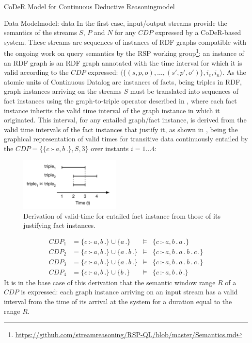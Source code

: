 \begin{nestedsection}{CoDeR Model for Continuous Deductive Reasoning}{model}
\begin{nestedsection}{Data Model}{model: data}
		In the first case, input/output streams provide the semantics of the streams $S$, $P$ and $N$ for any ${CDP}$ expressed by a CoDeR-based system.
		These streams are sequences of instances of RDF graphs compatible with the ongoing work on query semantics by the RSP working group\footnote{\url{https://github.com/streamreasoning/RSP-QL/blob/master/Semantics.md}};
		an instance of an RDF graph is an RDF graph annotated with the time interval for which it is valid \citep{SemanticStreamingManagement,sparkwave} according to the ${CDP}$ expressed: ${\langle \{(s,p,o),\dots,(s',p',o')\},i_{e},i_{n} \rangle}$.
		As the atomic units of Continuous Datalog are instances of facts, being triples in RDF, graph instances arriving on the streams $S$ must be translated into sequences of fact instances using the graph-to-triple operator described in , where each fact instance inherits the valid time interval of the graph instance in which it originated.
		This interval, for any entailed graph/fact instance, is derived from the valid time intervals of the fact instances that justify it, as shown in , being the graphical representation of valid times for transitive data continuously entailed by the ${CDP = \{\{c\,\text{:-}\,a,b\,.\},S,3\}}$ over instants ${i = 1 \dots 4}$:
		\begin{figure}[t]
			\centering
			\includegraphics[width=0.45\textwidth]{intersected-intervals}
			\caption{Derivation of valid-time for entailed fact instance from those of its justifying fact instances.}
		\end{figure}
		\begin{align*}
			CDP_{1} & = \{c\,\text{:-}\,a,b\,.\} \cup \{ a \, . \} & \vDash & \{ c\,\text{:-}\,a,b\,. \, a \, . \} \\
			CDP_{2} & = \{c\,\text{:-}\,a,b\,.\} \cup \{ a \, . \, b \, . \} & \vDash & \{ c\,\text{:-}\,a,b\,. \, a \, . \, b \, . \, c \, . \} \\
			CDP_{3} & = \{c\,\text{:-}\,a,b\,.\} \cup \{ a \, . \, b \, . \} & \vDash & \{ c\,\text{:-}\,a,b\,. \, a \, . \, b \, . \, c \, . \} \\
			CDP_{4} & = \{c\,\text{:-}\,a,b\,.\} \cup \{ b \, . \} & \vDash & \{ c\,\text{:-}\,a,b\,. \, b \, . \}
		\end{align*}
		It is in the base case of this derivation that the semantic window range $R$ of a ${CDP}$ is expressed:
		each graph instance arriving on an input stream has a valid interval from the time of its arrival at the system for a duration equal to the range $R$.


\end{nestedsection}
\end{nestedsection}
